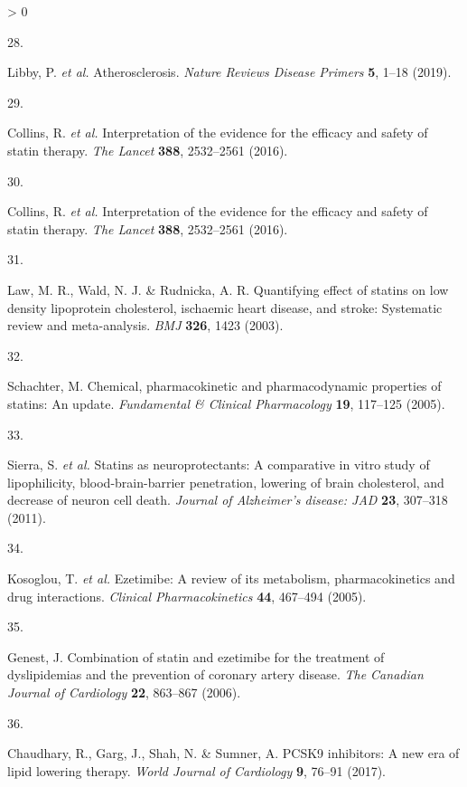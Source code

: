 \documentclass[a4paper, twoside]{templates/ociamthesis}
\newlength{\cslhangindent}
\newlength{\csllabelwidth}
\newenvironment{CSLReferences}[3] %
 {%
  \setlength{\parindent}{0pt}
  \ifodd #1 \everypar{\setlength{\hangindent}{\cslhangindent}}\ignorespaces\fi
  \ifnum #2 > 0
  \setlength{\parskip}{#2\baselineskip}
  \fi
 }%
 {}
\newcommand{\CSLLeftMargin}[1]{\parbox[t]{\maxof{\widthof{#1}}{\csllabelwidth}}{#1}}
\newcommand{\CSLRightInline}[1]{\parbox[t]{\linewidth - \csllabelwidth}{#1}}
\begin{document}
\begin{CSLReferences}{0}{0}
\leavevmode\hypertarget{ref-libby2019}{}%
\CSLLeftMargin{28. }
\CSLRightInline{Libby, P. \emph{et al.} Atherosclerosis. \emph{Nature Reviews Disease Primers} \textbf{5}, 1--18 (2019).}

\leavevmode\hypertarget{ref-collins2016}{}%
\CSLLeftMargin{29. }
\CSLRightInline{Collins, R. \emph{et al.} Interpretation of the evidence for the efficacy and safety of statin therapy. \emph{The Lancet} \textbf{388}, 2532--2561 (2016).}

\leavevmode\hypertarget{ref-collins2016a}{}%
\CSLLeftMargin{30. }
\CSLRightInline{Collins, R. \emph{et al.} Interpretation of the evidence for the efficacy and safety of statin therapy. \emph{The Lancet} \textbf{388}, 2532--2561 (2016).}

\leavevmode\hypertarget{ref-law2003}{}%
\CSLLeftMargin{31. }
\CSLRightInline{Law, M. R., Wald, N. J. \& Rudnicka, A. R. Quantifying effect of statins on low density lipoprotein cholesterol, ischaemic heart disease, and stroke: Systematic review and meta-analysis. \emph{BMJ} \textbf{326}, 1423 (2003).}

\leavevmode\hypertarget{ref-schachter2005}{}%
\CSLLeftMargin{32. }
\CSLRightInline{Schachter, M. Chemical, pharmacokinetic and pharmacodynamic properties of statins: An update. \emph{Fundamental \& Clinical Pharmacology} \textbf{19}, 117--125 (2005).}

\leavevmode\hypertarget{ref-sierra2011}{}%
\CSLLeftMargin{33. }
\CSLRightInline{Sierra, S. \emph{et al.} Statins as neuroprotectants: A comparative in vitro study of lipophilicity, blood-brain-barrier penetration, lowering of brain cholesterol, and decrease of neuron cell death. \emph{Journal of Alzheimer's disease: JAD} \textbf{23}, 307--318 (2011).}

\leavevmode\hypertarget{ref-kosoglou2005}{}%
\CSLLeftMargin{34. }
\CSLRightInline{Kosoglou, T. \emph{et al.} Ezetimibe: A review of its metabolism, pharmacokinetics and drug interactions. \emph{Clinical Pharmacokinetics} \textbf{44}, 467--494 (2005).}

\leavevmode\hypertarget{ref-genest2006}{}%
\CSLLeftMargin{35. }
\CSLRightInline{Genest, J. Combination of statin and ezetimibe for the treatment of dyslipidemias and the prevention of coronary artery disease. \emph{The Canadian Journal of Cardiology} \textbf{22}, 863--867 (2006).}

\leavevmode\hypertarget{ref-chaudhary2017}{}%
\CSLLeftMargin{36. }
\CSLRightInline{Chaudhary, R., Garg, J., Shah, N. \& Sumner, A. {PCSK9} inhibitors: A new era of lipid lowering therapy. \emph{World Journal of Cardiology} \textbf{9}, 76--91 (2017).}


\end{CSLReferences}
\end{document}
